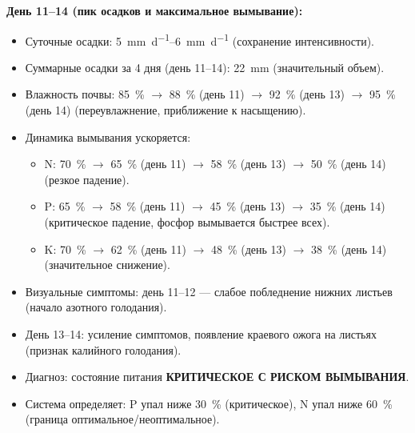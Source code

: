 \textbf{День 11--14 (пик осадков и максимальное вымывание):}
\begin{itemize}
    \item Суточные осадки: \SIrange{5}{6}{\milli\meter\per\day} (сохранение интенсивности).
    \item Суммарные осадки за \num{4} дня (день 11--14): \SI{22}{\milli\meter} (значительный объем).
    \item Влажность почвы: \SI{85}{\percent} $\to$ \SI{88}{\percent} (день \num{11}) $\to$ \SI{92}{\percent} (день \num{13}) $\to$ \SI{95}{\percent} (день \num{14}) (переувлажнение, приближение к насыщению).
    \item Динамика вымывания ускоряется:
    \begin{itemize}
        \item N: \SI{70}{\percent} $\to$ \SI{65}{\percent} (день \num{11}) $\to$ \SI{58}{\percent} (день \num{13}) $\to$ \SI{50}{\percent} (день \num{14}) (резкое падение).
        \item P: \SI{65}{\percent} $\to$ \SI{58}{\percent} (день \num{11}) $\to$ \SI{45}{\percent} (день \num{13}) $\to$ \SI{35}{\percent} (день \num{14}) (критическое падение, фосфор вымывается быстрее всех).
        \item K: \SI{70}{\percent} $\to$ \SI{62}{\percent} (день \num{11}) $\to$ \SI{48}{\percent} (день \num{13}) $\to$ \SI{38}{\percent} (день \num{14}) (значительное снижение).
    \end{itemize}
    \item Визуальные симптомы: день 11--12 --- слабое побледнение нижних листьев (начало азотного голодания).
    \item День 13--14: усиление симптомов, появление краевого ожога на листьях (признак калийного голодания).
    \item Диагноз: состояние питания \textbf{КРИТИЧЕСКОЕ С РИСКОМ ВЫМЫВАНИЯ}.
    \item Система определяет: P упал ниже \SI{30}{\percent} (критическое), N упал ниже \SI{60}{\percent} (граница оптимальное/неоптимальное).
\end{itemize}

